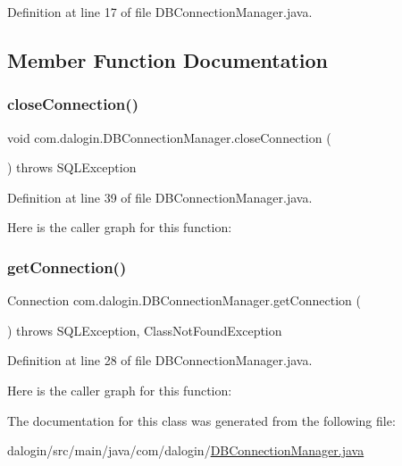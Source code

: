 Definition at line 17 of file D\+B\+Connection\+Manager.\+java.



\subsection{Member Function Documentation}
\mbox{\label{classcom_1_1dalogin_1_1_d_b_connection_manager_a525be4a64e02f21c1b4bd1d53ca73cc0}} 
\subsubsection{\texorpdfstring{close\+Connection()}{closeConnection()}}
{\footnotesize\ttfamily void com.\+dalogin.\+D\+B\+Connection\+Manager.\+close\+Connection (\begin{DoxyParamCaption}{ }\end{DoxyParamCaption}) throws S\+Q\+L\+Exception}



Definition at line 39 of file D\+B\+Connection\+Manager.\+java.

Here is the caller graph for this function\+:
\mbox{\label{classcom_1_1dalogin_1_1_d_b_connection_manager_a36917ade7183181ab00d32c126915db7}} 
\subsubsection{\texorpdfstring{get\+Connection()}{getConnection()}}
{\footnotesize\ttfamily Connection com.\+dalogin.\+D\+B\+Connection\+Manager.\+get\+Connection (\begin{DoxyParamCaption}{ }\end{DoxyParamCaption}) throws S\+Q\+L\+Exception, Class\+Not\+Found\+Exception}



Definition at line 28 of file D\+B\+Connection\+Manager.\+java.

Here is the caller graph for this function\+:


The documentation for this class was generated from the following file\+:\begin{DoxyCompactItemize}
\item 
dalogin/src/main/java/com/dalogin/\hyperlink{_d_b_connection_manager_8java}{D\+B\+Connection\+Manager.\+java}\end{DoxyCompactItemize}
